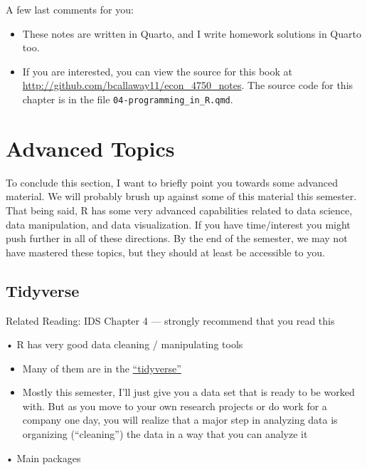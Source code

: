 \documentclass[
  letterpaper,
  DIV=11,
  numbers=noendperiod]{scrreprt}
\begin{document}
A few last comments for you:

\begin{itemize}
\item
  These notes are written in Quarto, and I write homework solutions in
  Quarto too.
\item
  If you are interested, you can view the source for this book at
  \url{http://github.com/bcallaway11/econ_4750_notes}. The source code
  for this chapter is in the file \texttt{04-programming\_in\_R.qmd}.
\end{itemize}

\section{Advanced Topics}\label{advanced-topics}

To conclude this section, I want to briefly point you towards some
advanced material. We will probably brush up against some of this
material this semester. That being said, R has some very advanced
capabilities related to data science, data manipulation, and data
visualization. If you have time/interest you might push further in all
of these directions. By the end of the semester, we may not have
mastered these topics, but they should at least be accessible to you.

\subsection{Tidyverse}\label{tidyverse}

Related Reading: IDS Chapter 4 --- strongly recommend that you read this

• R has very good data cleaning / manipulating tools

\begin{itemize}
\item
  Many of them are in the
  \href{https://www.tidyverse.org/}{``tidyverse''}
\item
  Mostly this semester, I'll just give you a data set that is ready to
  be worked with. But as you move to your own research projects or do
  work for a company one day, you will realize that a major step in
  analyzing data is organizing (``cleaning'') the data in a way that you
  can analyze it
\end{itemize}

• Main packages
\end{document}
